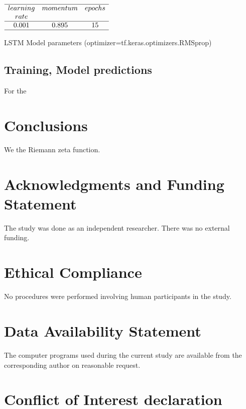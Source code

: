 \documentclass[twoside]{article}
\begin{document}
\begin{table}
\centering \(\begin{array}{cccccccccccc}

\hline
learning     &momentum  &epochs  \\
rate    &  &  \\
\hline
0.001 &0.895  & 15  \\
\hline
\end{array}\)
\caption{LSTM Model parameters (optimizer=tf.keras.optimizers.RMSprop)}
\label{tab:mean12}
\end{table}


\subsection{\label{relation}Training,  Model predictions}

For the 

\section{\label{conclusions}Conclusions}

We the Riemann zeta function.

\section*{Acknowledgments and Funding Statement}

 The study was done as an independent researcher. There was no
external funding.

\section*{Ethical Compliance}

 No procedures were performed  involving human participants in the study.

\section*{Data Availability Statement}

The computer programs used during the current study are
available from the corresponding author on reasonable request.

\section*{Conflict of Interest declaration} 
\end{document}
